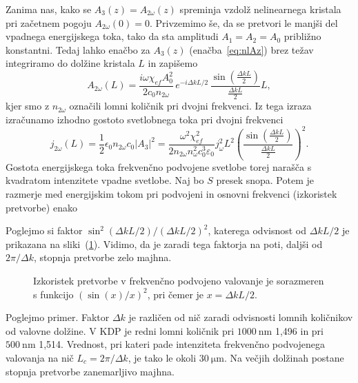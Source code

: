 Zanima nas, kako se $A_{3}(z) = A_{2\omega}(z)$ spreminja vzdolž nelinearnega kristala
pri začetnem pogoju $A_{2\omega}(0)=0$.
Privzemimo še, da se pretvori le manjši del vpadnega energijskega toka,
tako da sta amplitudi $A_{1}=A_{2}=A_0$ približno konstantni. Tedaj lahko
enačbo za $A_{3}(z)$ (enačba~\ref{eq:nlAz}) brez težav integriramo do dolžine kristala $L$ in 
zapišemo
\begin{equation}
A_{2\omega}(L)=\frac{i\omega \chi_{ef} A_0^2}{2c_0 n_{2\omega}}
\,e^{-i\Delta kL/2}\, \frac{\sin\left(\frac{\Delta k L}{2}\right)}{\frac{\Delta kL}{2}}L,
\label{8.9}
\end{equation}
kjer smo z $n_{2\omega}$ označili lomni količnik pri dvojni frekvenci.
Iz tega izraza izračunamo izhodno gostoto svetlobnega toka pri dvojni
frekvenci 
\begin{equation}
j_{2\omega}(L) =\frac{1}{2}\epsilon_{0}n_{2\omega}c_0|A_3|^2 = 
\frac{\omega^2 \chi_{ef}^2}{2 n_{2\omega} n_\omega^2c_0^3\varepsilon_0} j_\omega^2 L^2
\left(\frac{\sin\left(\frac{\Delta k L}{2}\right)}{\frac{\Delta kL}{2}}\right)^2.
\label{8.10}
\end{equation}
Gostota energijskega toka frekvenčno podvojene svetlobe torej narašča s kvadratom
intenzitete vpadne svetlobe. Naj bo $S$ presek snopa. Potem je razmerje med 
energijskim tokom pri podvojeni in osnovni frekvenci (izkoristek pretvorbe) enako

Poglejmo si faktor $\sin^{2}(\Delta kL/2)/(\Delta kL/2)^{2}$, katerega odvisnost
od $\Delta kL/2$ je prikazana na sliki~(\ref{fig:shg2}). Vidimo, da je zaradi tega
faktorja na poti, daljši od $2\pi /\Delta k$, stopnja pretvorbe zelo majhna.
\begin{figure}[h]
\centering
\def\svgwidth{90truemm} 

\caption{Izkoristek pretvorbe v frekvenčno podvojeno valovanje je 
sorazmeren s funkcijo $(\sin(x)/x)^2$,
pri čemer je $x = \Delta k L/2$.}
\label{fig:shg2}
\end{figure}

Poglejmo primer. Faktor $\Delta k$ je različen od nič zaradi odvisnosti
lomnih količnikov od valovne dolžine. V KDP je 
redni lomni količnik pri $1000~\si{\nano\metre}$ 1,496 in pri 
$500~\si{\nano\metre}$ 1,514. Vrednost, pri kateri
pade intenziteta frekvenčno podvojenega valovanja na nič
$L_{c}=2\pi /\Delta k$, je tako le okoli $30~\si{\micro\meter}$. Na večjih dolžinah
postane stopnja pretvorbe zanemarljivo majhna.

